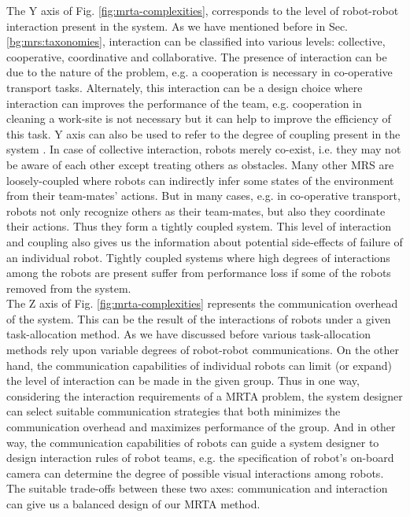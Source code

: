 The Y axis of Fig. \ref{fig:mrta-complexities},   corresponds to the level of robot-robot interaction present in the system. As we have mentioned before in Sec. \ref{bg:mrs:taxonomies}, interaction can be classified into various levels: collective, cooperative, coordinative and collaborative. The presence of interaction can be due to the nature of the problem, e.g. a cooperation is necessary in co-operative transport tasks. Alternately, this interaction can be a design choice where interaction can improves the performance of the team, e.g. cooperation in cleaning a work-site is not necessary but it can help to improve the  efficiency of this task. Y axis can also be used to refer to the degree of coupling present in the system \cite{Mataric2007}.  In case of collective interaction, robots merely co-exist, i.e.  they may not be aware of each other except treating others as obstacles. Many other MRS are loosely-coupled where robots can indirectly infer some states of the environment from their team-mates' actions.  But in many cases, e.g. in  co-operative transport, robots not only recognize others as their team-mates, but also they coordinate their actions. Thus they form a  tightly coupled system. This level of interaction and coupling also gives us the information about potential side-effects of failure of an individual robot. Tightly coupled systems where high degrees of interactions among the robots are present suffer from performance loss if some of the robots removed from the system.\\
The Z axis of Fig. \ref{fig:mrta-complexities} represents the communication overhead of the system. This can be the result of the interactions  of robots under a given task-allocation method. As we have discussed before various task-allocation methods rely upon variable degrees of robot-robot communications.  On the other hand, the communication capabilities of individual robots can limit (or expand) the level of interaction can be made  in the given group. Thus in one way, considering the interaction requirements of a MRTA problem, the system designer can  select suitable communication strategies that both minimizes the communication overhead and maximizes performance of the group. And in other way, the communication capabilities of robots can guide a system designer to design interaction rules of robot teams, e.g. the specification of robot's on-board camera  can determine the degree of possible visual interactions among robots. The suitable trade-offs between these two axes: communication and interaction can give us a balanced design of our MRTA method.\\

